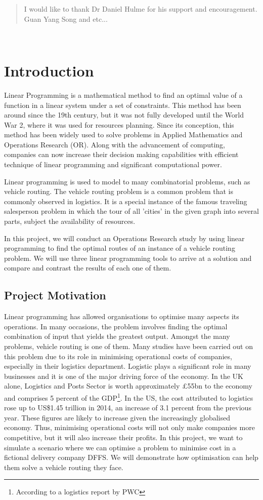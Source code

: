 \documentclass[a4paper, 12pt]{report}
\begin{document}
\renewcommand{\abstractname}{Acknowledgements}
\begin{abstract}
\centering
I would like to thank Dr Daniel Hulme for his support and encouragement. Guan Yang Song and etc...
\end{abstract}

\tableofcontents
\
\chapter{Introduction}
Linear Programming is a mathematical method to find an optimal value of a function in a linear system under a set of
constraints. This method has been around since the 19th century, but it was not fully developed until the World War 2,
where it was used for resources planning. Since its conception, this method has been widely used to solve problems
in Applied Mathematics and Operations Research (OR). Along with the advancement of computing, companies can now increase their
decision making capabilities with efficient technique of linear programming and significant computational power.

Linear programming is used to model to many combinatorial problems, such as vehicle routing.
The vehicle routing problem is a common problem that is commonly observed in logistics.
It is a special instance of the famous traveling salesperson problem in which the tour of
all 'cities' in the given graph into several parts, subject the availability of resources.

In this project, we will conduct an Operations Research study by using linear programming to find the optimal routes of an instance of a vehicle routing
problem. We will use three linear programming tools to arrive at a solution and compare and contrast the results of each one of them.

\section{Project Motivation}
Linear programming has allowed organisations to optimise many aspects its operations. In many occasions, the problem involves
finding the optimal combination of input that yields the greatest output. Amongst the many problems,
vehicle routing is one of them. Many studies have been carried out on this problem due to its role in minimising operational
costs of companies, especially in their logistics department. Logistic plays a significant role in many businesses and it is one of the major
driving force of the economy. In the UK alone, Logistics and Posts Sector is worth approximately
\pounds55bn to the economy and comprises 5 percent of the GDP\footnote{According to a logistics report by PWC }.
In the US, the cost attributed to logistics rose up to US\$1.45 trillion in 2014, an increase of 3.1 percent from the previous year.
These figures are likely to increase given the increasingly globalised economy. Thus, minimising operational costs will not only make companies
more competitive, but it will also increase their profits. In this project, we want to simulate a scenario where we can optimise
a problem to minimise cost in a fictional delivery company DFFS. We will demonstrate how optimisation can help them solve a vehicle
routing they face.
\end{document}
